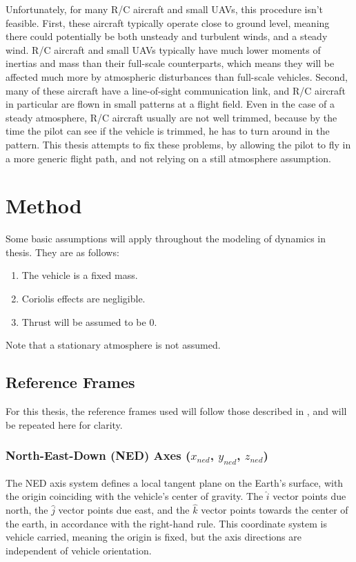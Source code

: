 \documentclass[12pt]{ucthesis}
\begin{document}
\indent
Unfortunately, for many R/C aircraft and small UAVs, this procedure isn't feasible. First, these aircraft typically operate close to ground level, meaning there could potentially be both unsteady and turbulent winds, and a steady wind. R/C aircraft and small UAVs typically have much lower moments of inertias and mass than their full-scale counterparts, which means they will be affected much more by atmospheric disturbances than full-scale vehicles. Second, many of these aircraft have a line-of-sight communication link, and R/C aircraft in particular are flown in small patterns at a flight field. Even in the case of a steady atmosphere, R/C aircraft usually are not well trimmed, because by the time the pilot can see if the vehicle is trimmed, he has to turn around in the pattern. This thesis attempts to fix these problems, by allowing the pilot to fly in a more generic flight path, and not relying on a still atmosphere assumption.

\chapter{Method}

\label{background-information}
Some basic assumptions will apply throughout the modeling of dynamics in thesis. They are as follows:
\begin{enumerate}
\item The vehicle is a fixed mass.
\item Coriolis effects are negligible.
\item Thrust will be assumed to be 0.
\end{enumerate}
Note that a stationary atmosphere is not assumed.

\section{Reference Frames}
For this thesis, the reference frames used will follow those described in \cite{klein2006aircraft}, and will be repeated here for clarity.

\subsection*{North-East-Down (NED) Axes ($x_{ned}$, $y_{ned}$, $z_{ned}$)}
The NED axis system defines a local tangent plane on the Earth's surface, with the origin coinciding with the vehicle's center of gravity. The $\hat{i}$ vector points due north, the $\hat{j}$ vector points due east, and the $\hat{k}$ vector points towards the center of the earth, in accordance with the right-hand rule. This coordinate system is vehicle carried, meaning the origin is fixed, but the axis directions are independent of vehicle orientation.
\end{document}
